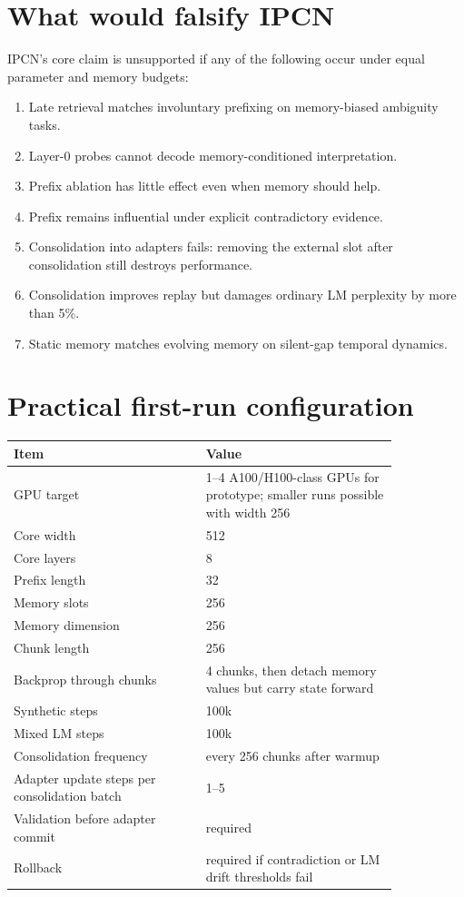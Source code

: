\documentclass[11pt]{article}
\begin{document}
\section{What would falsify IPCN}

IPCN's core claim is unsupported if any of the following occur under equal parameter and memory budgets:
\begin{enumerate}
    \item Late retrieval matches involuntary prefixing on memory-biased ambiguity tasks.
    \item Layer-0 probes cannot decode memory-conditioned interpretation.
    \item Prefix ablation has little effect even when memory should help.
    \item Prefix remains influential under explicit contradictory evidence.
    \item Consolidation into adapters fails: removing the external slot after consolidation still destroys performance.
    \item Consolidation improves replay but damages ordinary LM perplexity by more than 5\%.
    \item Static memory matches evolving memory on silent-gap temporal dynamics.
\end{enumerate}

\section{Practical first-run configuration}

\begin{longtable}{p{0.42\linewidth}p{0.42\linewidth}}
\toprule
\textbf{Item} & \textbf{Value}\\
\midrule
GPU target & 1--4 A100/H100-class GPUs for prototype; smaller runs possible with width 256\\
Core width & 512\\
Core layers & 8\\
Prefix length & 32\\
Memory slots & 256\\
Memory dimension & 256\\
Chunk length & 256\\
Backprop through chunks & 4 chunks, then detach memory values but carry state forward\\
Synthetic steps & 100k\\
Mixed LM steps & 100k\\
Consolidation frequency & every 256 chunks after warmup\\
Adapter update steps per consolidation batch & 1--5\\
Validation before adapter commit & required\\
Rollback & required if contradiction or LM drift thresholds fail\\
\bottomrule
\end{longtable}
\end{document}
